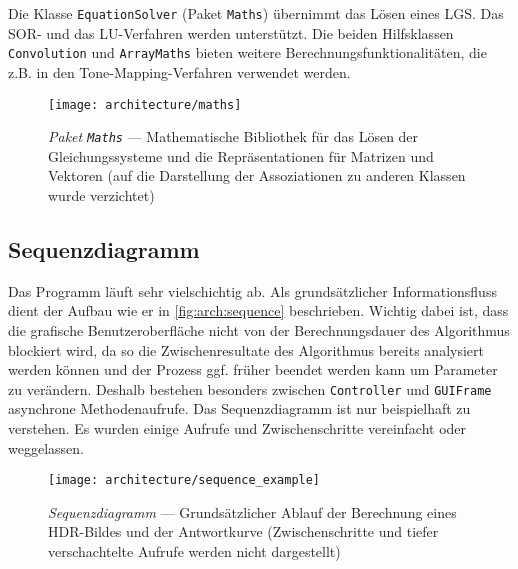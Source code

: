 Die Klasse \texttt{EquationSolver} (Paket \texttt{Maths}) übernimmt das Lösen eines \gls{LGS}. Das \gls{SOR}- und das LU-Verfahren werden unterstützt. Die beiden Hilfsklassen \texttt{Convolution} und \texttt{ArrayMaths} bieten weitere Berechnungsfunktionalitäten, die z.B. in den \gls{Tone-Mapping}-Verfahren verwendet werden. 

\begin{figure}
  \begin{center}
    \texttt{[image: architecture/maths]}
    \caption{\textit{Paket \texttt{Maths}} --- Mathematische Bibliothek für das Lösen der Gleichungssysteme und die Repräsentationen für Matrizen und Vektoren (auf die Darstellung der Assoziationen zu anderen Klassen wurde verzichtet)}
    \label{fig:arch:matrix}
  \end{center}
\end{figure}




\subsection{Sequenzdiagramm}
Das Programm läuft sehr vielschichtig ab. Als grundsätzlicher Informationsfluss dient der Aufbau wie er in \autoref{fig:arch:sequence} beschrieben. Wichtig dabei ist, dass die grafische Benutzeroberfläche nicht von der Berechnungsdauer des Algorithmus blockiert wird, da so die Zwischenresultate des Algorithmus bereits analysiert werden können und der Prozess ggf. früher beendet werden kann um Parameter zu verändern. Deshalb bestehen besonders zwischen \texttt{Controller} und \texttt{GUIFrame} asynchrone Methodenaufrufe. Das Sequenzdiagramm ist nur beispielhaft zu verstehen. Es wurden einige Aufrufe und Zwischenschritte vereinfacht oder weggelassen.

\begin{figure}
  \begin{center}
    \texttt{[image: architecture/sequence\_example]}
    \caption{\textit{Sequenzdiagramm} --- Grundsätzlicher Ablauf der Berechnung eines HDR-Bildes und der Antwortkurve (Zwischenschritte und tiefer verschachtelte Aufrufe werden nicht dargestellt) }
    \label{fig:arch:sequence}
  \end{center}
\end{figure}


